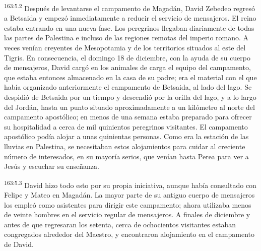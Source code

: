 \par 
\textsuperscript{163:5.2} Después de levantarse el campamento de Magadán, David Zebedeo regresó a Betsaida y empezó inmediatamente a reducir el servicio de mensajeros. El reino estaba entrando en una nueva fase. Los peregrinos llegaban diariamente de todas las partes de Palestina e incluso de las regiones remotas del imperio romano. A veces venían creyentes de Mesopotamia y de los territorios situados al este del Tigris. En consecuencia, el domingo 18 de diciembre, con la ayuda de su cuerpo de mensajeros, David cargó en los animales de carga el equipo del campamento, que estaba entonces almacenado en la casa de su padre; era el material con el que había organizado anteriormente el campamento de Betsaida, al lado del lago. Se despidió de Betsaida por un tiempo y descendió por la orilla del lago, y a lo largo del Jordán, hasta un punto situado aproximadamente a un kilómetro al norte del campamento apostólico; en menos de una semana estaba preparado para ofrecer su hospitalidad a cerca de mil quinientos peregrinos visitantes. El campamento apostólico podía alojar a unas quinientas personas. Como era la estación de las lluvias en Palestina, se necesitaban estos alojamientos para cuidar al creciente número de interesados, en su mayoría serios, que venían hasta Perea para ver a Jesús y escuchar su enseñanza.

\par 
\textsuperscript{163:5.3} David hizo todo esto por su propia iniciativa, aunque había consultado con Felipe y Mateo en Magadán. La mayor parte de su antiguo cuerpo de mensajeros los empleó como asistentes para dirigir este campamento; ahora utilizaba menos de veinte hombres en el servicio regular de mensajeros. A finales de diciembre y antes de que regresaran los setenta, cerca de ochocientos visitantes estaban congregados alrededor del Maestro, y encontraron alojamiento en el campamento de David.

